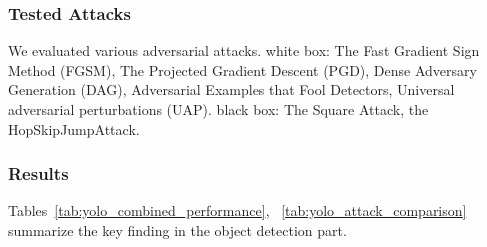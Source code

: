 \documentclass[conference]{IEEEtran}
\begin{document}
\subsubsection{Tested Attacks}
We evaluated various adversarial attacks. white box: The Fast Gradient Sign Method (FGSM), The Projected Gradient Descent (PGD), Dense Adversary Generation (DAG), Adversarial Examples that Fool Detectors, Universal adversarial perturbations (UAP)\cite{goodfellow2015explaining,madry2018towardspgd, xie2017DAG, lu2017fooldetectors, moosavi2017universal}. black box: The Square Attack, the HopSkipJumpAttack\cite{andriushchenko2020square,chen2020hopskipjumpattackqueryefficientdecisionbasedattack}.


\subsubsection{Results}
Tables~\ref{tab:yolo_combined_performance}, ~\ref{tab:yolo_attack_comparison} summarize the key finding in the object detection part.  
\end{document}
